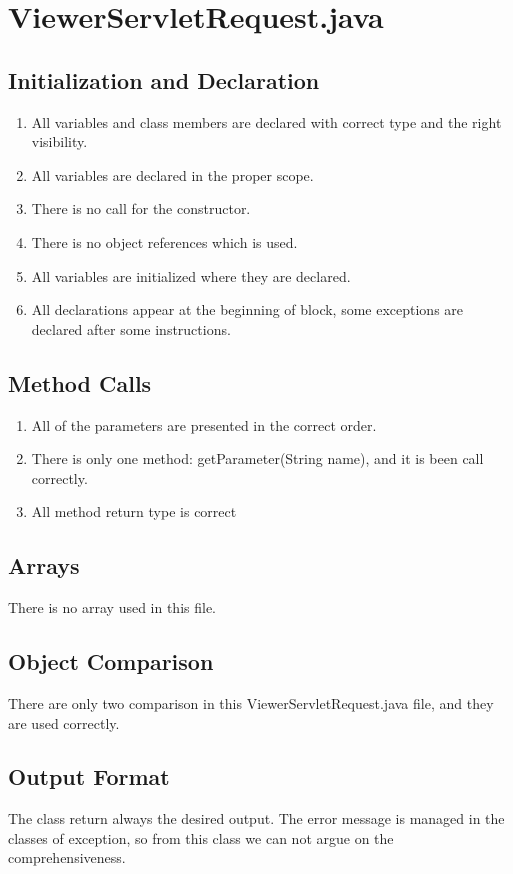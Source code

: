 \documentclass{article}
\begin{document}
\newpage

\section{ViewerServletRequest.java}

\subsection{Initialization and Declaration}
\begin{enumerate}
\item 
All variables and class members are declared with correct type and the right visibility.
\item
All variables are declared in the proper scope.
\item
There is no call for the constructor.
\item
There is no object references which is used.
\item 
All variables are initialized where they are declared.
\item
All declarations appear at the beginning of block, some exceptions are declared after some instructions.
\end{enumerate}

\subsection{Method Calls}
\begin{enumerate}
	\item All of the parameters are presented in the correct order.
	\item There is only one method: getParameter(String name), and it is been call correctly.
	\item All method return type is correct
\end{enumerate}
 
\subsection{Arrays}
There is no array used in this file.

\subsection{Object Comparison}
There are only two comparison in this ViewerServletRequest.java file, and they are used correctly.

\subsection{Output Format}
The class return always the desired output.
The error message is managed in the classes of exception, so from this class we can not argue on the comprehensiveness.
\end{document}
